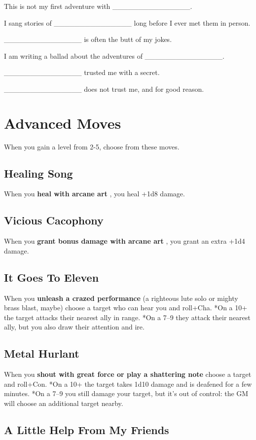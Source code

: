  This is not my first adventure with \_\_\_\_\_\_\_\_\_\_\_\_\_\_\_.


 I sang stories of \_\_\_\_\_\_\_\_\_\_\_\_\_\_\_ long before I ever met them in person.


 \_\_\_\_\_\_\_\_\_\_\_\_\_\_\_ is often the butt of my jokes.


 I am writing a ballad about the adventures of \_\_\_\_\_\_\_\_\_\_\_\_\_\_\_.


 \_\_\_\_\_\_\_\_\_\_\_\_\_\_\_ trusted me with a secret.


 \_\_\_\_\_\_\_\_\_\_\_\_\_\_\_ does not trust me, and for good reason.
\section{Advanced Moves}


 {\Large When you gain a level from 2-5, choose from these moves.}
\subsection{Healing Song}


 When you \textbf{heal with arcane art}
, you heal +1d8 damage.
\subsection{Vicious Cacophony}


 When you \textbf{grant bonus damage with arcane art}
, you grant an extra +1d4 damage.
\subsection{It Goes To Eleven}


 When you \textbf{unleash a crazed performance}
 (a righteous lute solo or mighty brass blast, maybe) choose a target who can hear you and roll+Cha. *On a 10+ the target attacks their nearest ally in range. *On a 7--9 they attack their nearest ally, but you also draw their attention and ire.
\subsection{Metal Hurlant}


 When you \textbf{shout with great force or play a shattering note}
 choose a target and roll+Con. *On a 10+ the target takes 1d10 damage and is deafened for a few minutes. *On a 7--9 you still damage your target, but it's out of control: the GM will choose an additional target nearby.
\subsection{A Little Help From My Friends}


